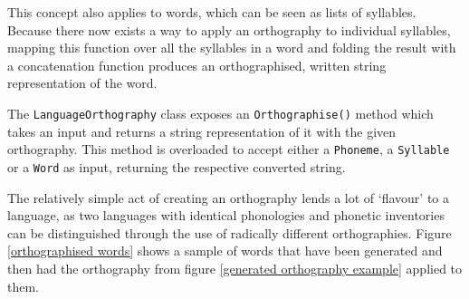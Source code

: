 \documentclass{report}
\begin{document}
	This concept also applies to words, which can be seen as lists of syllables. Because there now exists a way to apply an orthography to individual syllables, mapping this function over all the syllables in a word and folding the result with a concatenation function produces an orthographised, written string representation of the word.
	
	The \texttt{LanguageOrthography} class exposes an \texttt{Orthographise()} method which takes an input and returns a string representation of it with the given orthography. This method is overloaded to accept either a \texttt{Phoneme}, a \texttt{Syllable} or a \texttt{Word} as input, returning the respective converted string.
		
	The relatively simple act of creating an orthography lends a lot of `flavour' to a language, as two languages with identical phonologies and phonetic inventories can be distinguished through the use of radically different orthographies. Figure \ref{orthographised words} shows a sample of words that have been generated and then had the orthography from figure \ref{generated orthography example} applied to them.
	
\end{document}
